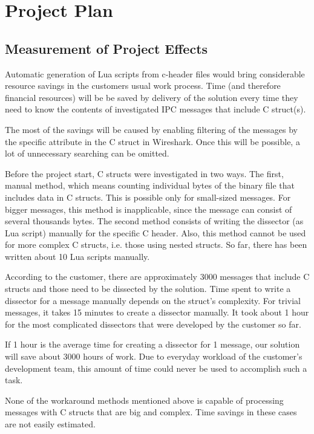 \section{Project Plan}


\subsection{Measurement of Project Effects}
Automatic generation of Lua scripts from c-header files would bring considerable resource savings in the customers usual work process. Time (and therefore financial resources) will be  be saved by delivery of the solution every time they need to know the contents of investigated IPC messages that include C struct(s).

The most of the savings will be caused by enabling filtering of the messages by the specific attribute in the C struct in Wireshark. Once this will be possible, a lot of unnecessary searching can be omitted.

Before the project start, C structs were investigated in two ways. The first, manual method, which means counting individual bytes of the binary file that includes data in C structs. This is possible only for small-sized messages. For bigger messages, this method is inapplicable, since the message can consist of several thousands bytes. The second method consists of writing the dissector (as Lua script) manually for the specific C header. Also, this method cannot be used for more complex C structs, i.e. those using nested structs. So far, there has been written about 10 Lua scripts manually.

According to the customer, there are approximately 3000 messages that include C structs and those need to be dissected by the solution. Time spent to write a dissector for a message manually depends on the struct’s complexity. For trivial messages, it takes 15 minutes to create a dissector manually. It took about 1 hour for the most complicated dissectors that were developed by the customer so far.

If 1 hour is the average time for creating a dissector for 1 message, our solution will save about 3000 hours of work. Due to everyday workload of the customer’s development team, this amount of time could never be used to accomplish such a task.

None of the workaround methods mentioned above is capable of processing messages with C structs that are big and complex. Time savings in these cases are not easily estimated.

